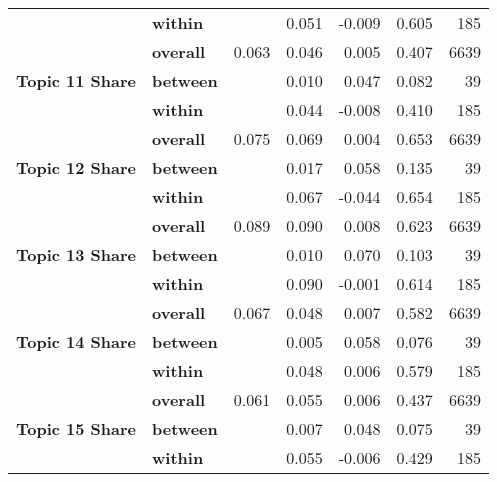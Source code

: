 \begin{longtable}{lllrrrr}
               & \textbf{within} &       &      0.051 & -0.009 & 0.605 &           185 \\
\cline{1-7}
\multirow{3}{*}{\textbf{Topic 11 Share}} & \textbf{overall} & 0.063 &      0.046 &  0.005 & 0.407 &          6639 \\
               & \textbf{between} &       &      0.010 &  0.047 & 0.082 &            39 \\
               & \textbf{within} &       &      0.044 & -0.008 & 0.410 &           185 \\
\cline{1-7}
\multirow{3}{*}{\textbf{Topic 12 Share}} & \textbf{overall} & 0.075 &      0.069 &  0.004 & 0.653 &          6639 \\
               & \textbf{between} &       &      0.017 &  0.058 & 0.135 &            39 \\
               & \textbf{within} &       &      0.067 & -0.044 & 0.654 &           185 \\
\cline{1-7}
\multirow{3}{*}{\textbf{Topic 13 Share}} & \textbf{overall} & 0.089 &      0.090 &  0.008 & 0.623 &          6639 \\
               & \textbf{between} &       &      0.010 &  0.070 & 0.103 &            39 \\
               & \textbf{within} &       &      0.090 & -0.001 & 0.614 &           185 \\
\cline{1-7}
\multirow{3}{*}{\textbf{Topic 14 Share}} & \textbf{overall} & 0.067 &      0.048 &  0.007 & 0.582 &          6639 \\
               & \textbf{between} &       &      0.005 &  0.058 & 0.076 &            39 \\
               & \textbf{within} &       &      0.048 &  0.006 & 0.579 &           185 \\
\cline{1-7}
\multirow{3}{*}{\textbf{Topic 15 Share}} & \textbf{overall} & 0.061 &      0.055 &  0.006 & 0.437 &          6639 \\
               & \textbf{between} &       &      0.007 &  0.048 & 0.075 &            39 \\
               & \textbf{within} &       &      0.055 & -0.006 & 0.429 &           185 \\
\bottomrule
\end{longtable}